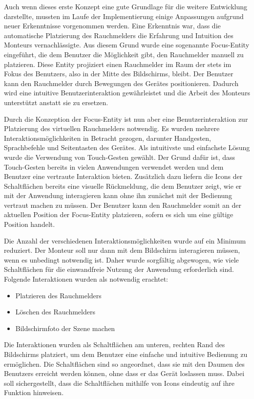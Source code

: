 Auch wenn dieses erste Konzept eine gute Grundlage für die weitere Entwicklung darstellte, mussten im Laufe der Implementierung einige Anpassungen aufgrund neuer Erkenntnisse vorgenommen werden. Eine Erkenntnis war, dass die automatische Platzierung des Rauchmelders die Erfahrung und Intuition des Monteurs vernachlässigte. Aus diesem Grund wurde eine sogenannte Focus-Entity eingeführt, die dem Benutzer die Möglichkeit gibt, den Rauchmelder manuell zu platzieren. Diese Entity projiziert einen Rauchmelder im Raum der stets im Fokus des Benutzers, also in der Mitte des Bildschirms, bleibt. Der Benutzer kann den Rauchmelder durch Bewegungen des Gerätes positionieren. Dadurch wird eine intuitive Benutzerinteraktion gewährleistet und die Arbeit des Monteurs unterstützt anstatt sie zu ersetzen.

Durch die Konzeption der Focus-Entity ist nun aber eine Benutzerinteraktion zur Platzierung des virtuellen Rauchmelders notwendig. Es wurden mehrere Interaktionsmöglichkeiten in Betracht gezogen, darunter Handgesten, Sprachbefehle und Seitentasten des Gerätes. Als intuitivste und einfachste Lösung wurde die Verwendung von Touch-Gesten gewählt. Der Grund dafür ist, dass Touch-Gesten bereits in vielen Anwendungen verwendet werden und dem Benutzer eine vertraute Interaktion bieten. Zusätzlich dazu liefern die Icons der Schaltflächen bereits eine visuelle Rückmeldung, die dem Benutzer zeigt, wie er mit der Anwendung interagieren kann ohne ihn zunächst mit der Bedienung vertraut machen zu müssen. Der Benutzer kann den Rauchmelder somit an der aktuellen Position der Focus-Entity platzieren, sofern es sich um eine gültige Position handelt.

Die Anzahl der verschiedenen Interaktionsmöglichkeiten wurde auf ein Minimum reduziert. Der Monteur soll nur dann mit dem Bildschirm interagieren müssen, wenn es unbedingt notwendig ist. Daher wurde sorgfältig abgewogen, wie viele Schaltflächen für die einwandfreie Nutzung der Anwendung erforderlich sind. Folgende Interaktionen wurden als notwendig erachtet:

\begin{itemize}
    \item Platzieren des Rauchmelders
    \item Löschen des Rauchmelders
    \item Bildschirmfoto der Szene machen
\end{itemize}

Die Interaktionen wurden als Schaltflächen am unteren, rechten Rand des Bildschirms platziert, um dem Benutzer eine einfache und intuitive Bedienung zu ermöglichen. Die Schaltflächen sind so angeordnet, dass sie mit den Daumen des Benutzers erreicht werden können, ohne dass er das Gerät loslassen muss. Dabei soll sichergestellt, dass die Schaltflächen mithilfe von Icons eindeutig auf ihre Funktion hinweisen.

